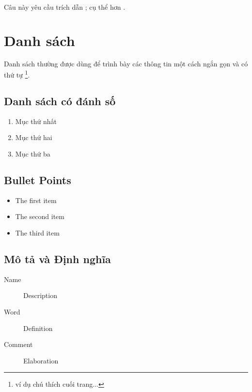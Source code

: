 \documentclass[12pt,fleqn]{book} %
\begin{document}
Câu này yêu cầu trích dẫn \cite{book_key}; cụ thể hơn \cite[122]{article_key}.


\section{Danh sách}

Danh sách thường được dùng để trình bày các thông tin một cách ngắn gọn và có thứ tự \footnote{ví dụ chú thích cuối trang...}.

\subsection{Danh sách có đánh số}

\begin{enumerate}
\item Mục thứ nhất
\item Mục thứ hai
\item Mục thứ ba
\end{enumerate}

\subsection{Bullet Points}

\begin{itemize}
\item The first item
\item The second item
\item The third item
\end{itemize}

\subsection{Mô tả và Định nghĩa}

\begin{description}
\item[Name] Description
\item[Word] Definition
\item[Comment] Elaboration
\end{description}

\end{document}
